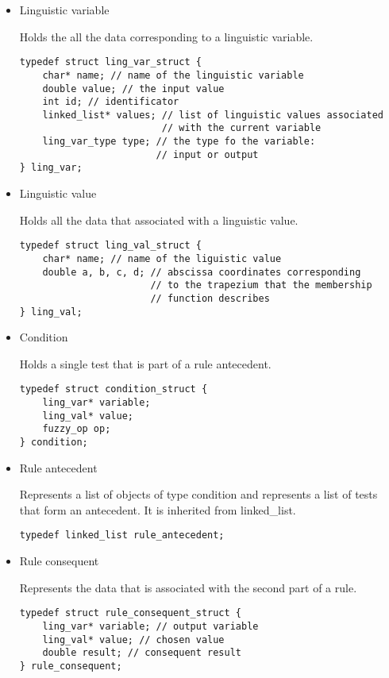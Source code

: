 \begin{itemize}
\item Linguistic variable \par
Holds the all the data corresponding to a linguistic variable.
\begin{lstlisting}[frame=single]
typedef struct ling_var_struct {
    char* name; // name of the linguistic variable
    double value; // the input value
    int id; // identificator
    linked_list* values; // list of linguistic values associated
                         // with the current variable
    ling_var_type type; // the type fo the variable:
                        // input or output
} ling_var;
\end{lstlisting}

\item Linguistic value \par
Holds all the data that associated with a linguistic value.
\begin{lstlisting}[frame=single]
typedef struct ling_val_struct {
    char* name; // name of the liguistic value
    double a, b, c, d; // abscissa coordinates corresponding
                       // to the trapezium that the membership
                       // function describes
} ling_val;
\end{lstlisting}

\item Condition \par
Holds a single test that is part of a rule antecedent.
\begin{lstlisting}[frame=single]
typedef struct condition_struct {
    ling_var* variable;
    ling_val* value;
    fuzzy_op op;
} condition;
\end{lstlisting}

\item Rule antecedent \par
Represents a list of objects of type condition and represents a list of tests that form an antecedent. It is
inherited from linked_list.
\begin{lstlisting}[frame=single]
typedef linked_list rule_antecedent;
\end{lstlisting}

\item Rule consequent \par
Represents the data that is associated with the second part of a rule.
\begin{lstlisting}[frame=single]
typedef struct rule_consequent_struct {
    ling_var* variable; // output variable
    ling_val* value; // chosen value
    double result; // consequent result
} rule_consequent;
\end{lstlisting}


\end{itemize}
